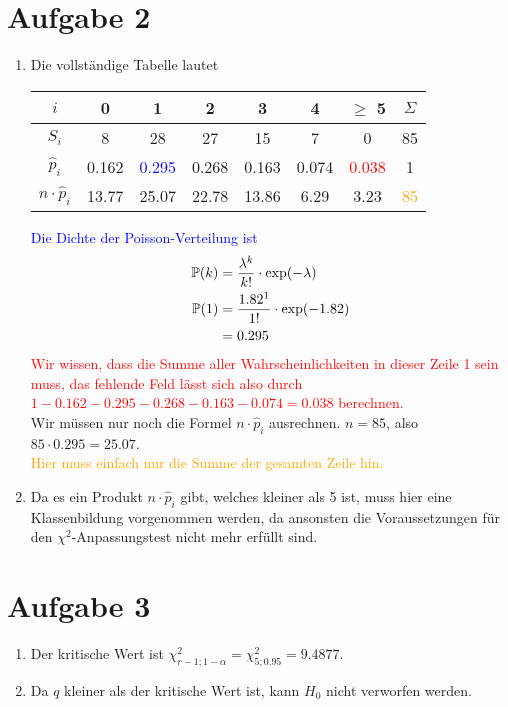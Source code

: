 \documentclass{article}
\begin{document}
	\section*{Aufgabe 2}
	\begin{enumerate}[label=(\alph*)]
		\item Die vollständige Tabelle lautet
		\begin{center}
			\begin{tabular}{c|cccccc|c}
				$i$ & 0 & 1 & 2 & 3 & 4 & $\ge$ 5 & $\Sigma$ \\
				\hline
				$S_i$ & 8 & 28 & 27 & 15 & 7 & 0 & 85 \\
				$\hat{p}_i$ & 0.162 & \textcolor{blue}{0.295} & 0.268 & 0.163 & 0.074 & \textcolor{red}{0.038} & 1 \\
				$n\cdot \hat{p}_i$ & 13.77 & \textcolor{green!80!black}{25.07} & 22.78 & 13.86 & 6.29 & 3.23 & \textcolor{orange}{85}
			\end{tabular}
		\end{center}
		\textcolor{blue}{Die Dichte der Poisson-Verteilung ist
		\begin{align}
			\mathbb{P}(k) &= \frac{\lambda^k}{k!}\cdot\exp(-\lambda) \notag \\
			\mathbb{P}(1) &= \frac{1.82^1}{1!}\cdot\exp(-1.82) \notag \\
			&= 0.295 \notag
		\end{align}}
		\textcolor{red}{Wir wissen, dass die Summe aller Wahrscheinlichkeiten in dieser Zeile 1 sein muss, das fehlende Feld lässt sich also durch $1-0.162-0.295-0.268-0.163-0.074 = 0.038$ berechnen.} \\
		\textcolor{green!80!black}{Wir müssen nur noch die Formel $n\cdot\hat{p}_i$ ausrechnen. $n=85$, also $85\cdot 0.295 = 25.07$.} \\
		\textcolor{orange}{Hier muss einfach nur die Summe der gesamten Zeile hin.}
		\item Da es ein Produkt $n\cdot\hat{p}_i$ gibt, welches kleiner als 5 ist, muss hier eine Klassenbildung vorgenommen werden, da ansonsten die Voraussetzungen für den $\chi^2$-Anpassungstest nicht mehr erfüllt sind.
	\end{enumerate}

	\section*{Aufgabe 3}
	\begin{enumerate}[label=(\alph*)]
		\item Der kritische Wert ist $\chi^2_{r-1;1-\alpha} = \chi^2_{5;0.95} = 9.4877$.
		\item Da $q$ kleiner als der kritische Wert ist, kann $H_0$ nicht verworfen werden.
	\end{enumerate}
\end{document}
